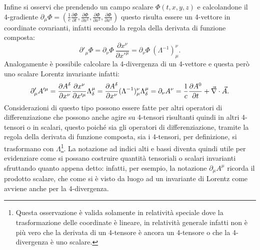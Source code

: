 Infine si osservi che prendendo un campo scalare $\Phi(t,x,y,z)$ e calcolandone il 4-gradiente $\partial_\mu\Phi=(\frac{1}{c}\frac{\partial\Phi}{\partial t},\frac{\partial\Phi}{\partial x^1},\frac{\partial\Phi}{\partial x^2},\frac{\partial\Phi}{\partial x^3})$ questo risulta essere un 4-vettore in coordinate covarianti, infatti secondo la regola della derivata di funzione composta:
\begin{equation*}
    \partial'_\mu\Phi=\partial_\nu\Phi\ \frac{\partial x^\nu}{\partial x'^\mu}=\partial_\nu\Phi\ (\Lambda^{-1})_\mu^\nu.
\end{equation*}
Analogamente è possibile calcolare la 4-divergenza di un 4-vettore e questa però uno scalare Lorentz invariante infatti:
\begin{equation*}
    \partial'_\mu A'^\mu=\frac{\partial A^\delta}{\partial x^\nu} \frac{\partial x^\nu}{\partial x'^\mu}\Lambda^\mu_\delta=\frac{\partial A^\delta}{\partial x^\nu}(\Lambda^{-1})_\mu^\nu \Lambda^\mu_\delta=\partial_\nu A^\nu=\frac{1}{c}\frac{\partial A^0}{\partial t}+\vec{\nabla}\cdot \vec{A}.
\end{equation*} 
Considerazioni di questo tipo possono essere fatte per altri operatori di differenziazione che possono anche agire su 4-tensori risultanti quindi in altri 4-tensori o in scalari, questo poiché sia gli operatori di differenziazione, tramite la regola della derivata di funzione composta, sia i 4-tensori, per definizione, si trasformano con $\Lambda$\footnote{Questa osservazione è valida solamente in relatività speciale dove la trasformazione delle coordinate è lineare, in relatività generale infatti non è più vero che la derivata di un 4-tensore è ancora un 4-tensore o che la 4-divergenza è uno scalare.}. La notazione ad indici alti e bassi diventa quindi utile per evidenziare come si possano costruire quantità tensoriali o scalari invarianti sfruttando quanto appena detto: infatti, per esempio, la notazione $\partial_\mu A^\mu$ ricorda il prodotto scalare, che come si è visto da luogo ad un invariante di Lorentz come avviene anche per la 4-divergenza.\\
